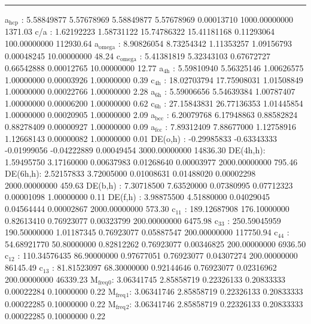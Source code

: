 \documentclass[11pt]{article}
\begin{document}
\noindent\rule{\textwidth}{0.5pt}
a\(_{\text{hcp}}\)   :   5.58849877   5.57678969   5.58849877   5.57678969   0.00013710 1000.00000000      1371.03
c/a     :   1.62192223   1.58731122  15.74786322  15.41181168   0.11293064 100.00000000    112930.64
a\(_{\text{omega}}\) :   8.90826054   8.73254342   1.11353257   1.09156793   0.00048245  10.00000000        48.24
c\(_{\text{omega}}\) :   5.41381819   5.32343103   0.67672727   0.66542888   0.00012765  10.00000000        12.77
a\(_{\text{4h}}\)    :   5.59810940   5.56325146   1.00626575   1.00000000   0.00003926   1.00000000         0.39
c\(_{\text{4h}}\)    :  18.02703794  17.75908031   1.01508849   1.00000000   0.00022766   1.00000000         2.28
a\(_{\text{6h}}\)    :   5.59006656   5.54639384   1.00787407   1.00000000   0.00006200   1.00000000         0.62
c\(_{\text{6h}}\)    :  27.15843831  26.77136353   1.01445854   1.00000000   0.00020905   1.00000000         2.09
a\(_{\text{bcc}}\)   :   6.20079768   6.17948863   0.88582824   0.88278409   0.00000927   1.00000000         0.09
a\(_{\text{fcc}}\)   :   7.89312409   7.88677000   1.12758916   1.12668143   0.00000082   1.00000000         0.01
DE(o,h) :  -0.29985833  -0.63343333  -0.01999056  -0.04222889   0.00049454 3000.00000000     14836.30
DE(4h,h):   1.59495750   3.17160000   0.00637983   0.01268640   0.00003977 2000.00000000       795.46
DE(6h,h):   2.52157833   3.72005000   0.01008631   0.01488020   0.00002298 2000.00000000       459.63
DE(b,h) :   7.30718500   7.63520000   0.07380995   0.07712323   0.00001098   1.00000000         0.11
DE(f,h) :   3.98875500   4.51880000   0.04029045   0.04564444   0.00002867 2000.00000000       573.30
c\(_{\text{11}}\)    : 189.12687908 176.10000000   0.82613410   0.76923077   0.00323799 200.00000000      6475.98
c\(_{\text{33}}\)    : 250.59045959 190.50000000   1.01187345   0.76923077   0.05887547 200.00000000    117750.94
c\(_{\text{44}}\)    :  54.68921770  50.80000000   0.82812262   0.76923077   0.00346825 200.00000000      6936.50
c\(_{\text{12}}\)    : 110.34576435  86.90000000   0.97677051   0.76923077   0.04307274 200.00000000     86145.49
c\(_{\text{13}}\)    :  81.81523097  68.30000000   0.92144646   0.76923077   0.02316962 200.00000000     46339.23
M\(_{\text{freq}}\)\(_{\text{0}}\):   3.06341745   2.85858719   0.22326133   0.20833333   0.00022284   0.10000000         0.22
M\(_{\text{freq}}\)\(_{\text{1}}\):   3.06341746   2.85858719   0.22326133   0.20833333   0.00022285   0.10000000         0.22
M\(_{\text{freq}}\)\(_{\text{2}}\):   3.06341746   2.85858719   0.22326133   0.20833333   0.00022285   0.10000000         0.22
\end{document}
